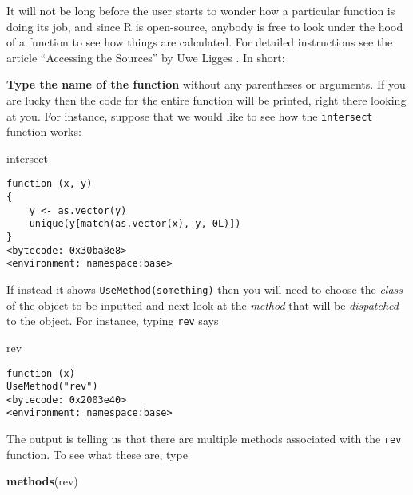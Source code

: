 \documentclass[]{book}
\newenvironment{Shaded}{\begin{snugshade}}{\end{snugshade}}
\newcommand{\KeywordTok}[1]{\textcolor[rgb]{0.13,0.29,0.53}{\textbf{{#1}}}}
\newcommand{\NormalTok}[1]{{#1}}
\numberwithin{equation}{chapter}
\numberwithin{figure}{chapter}
\theoremstyle{plain}
\theoremstyle{definition}
\theoremstyle{remark}
\theoremstyle{definition}
\theoremstyle{definition}
\theoremstyle{remark}
\begin{document}
It will not be long before the user starts to wonder how a particular
function is doing its job, and since R is open-source, anybody is free
to look under the hood of a function to see how things are calculated.
For detailed instructions see the article ``Accessing the Sources'' by
Uwe Ligges \autocite{Ligges2006}. In short:

\textbf{Type the name of the function} without any parentheses or
arguments. If you are lucky then the code for the entire function will
be printed, right there looking at you. For instance, suppose that we
would like to see how the \texttt{intersect}
 function works:

\begin{Shaded}
\begin{Highlighting}[]
\NormalTok{intersect}
\end{Highlighting}
\end{Shaded}

\begin{verbatim}
function (x, y) 
{
    y <- as.vector(y)
    unique(y[match(as.vector(x), y, 0L)])
}
<bytecode: 0x30ba8e8>
<environment: namespace:base>
\end{verbatim}

If instead it shows \texttt{UseMethod(something)}
 then you will need to choose the
\emph{class} of the object to be inputted and next look at the
\emph{method} that will be \emph{dispatched} to the object. For
instance, typing \texttt{rev}  says

\begin{Shaded}
\begin{Highlighting}[]
\NormalTok{rev}
\end{Highlighting}
\end{Shaded}

\begin{verbatim}
function (x) 
UseMethod("rev")
<bytecode: 0x2003e40>
<environment: namespace:base>
\end{verbatim}

The output is telling us that there are multiple methods associated with
the \texttt{rev} function. To see what these are, type

\begin{Shaded}
\begin{Highlighting}[]
\KeywordTok{methods}\NormalTok{(rev)}
\end{Highlighting}
\end{Shaded}
\end{document}
